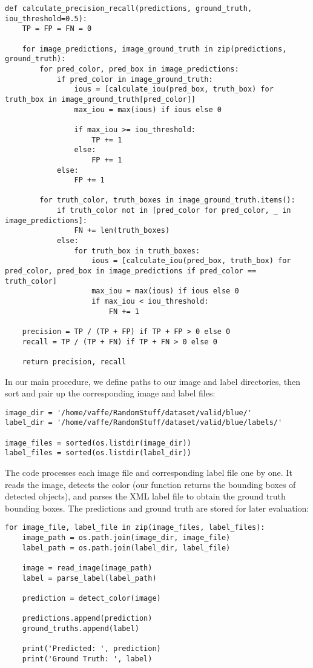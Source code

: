 \begin{lstlisting}[language=PythonPlus]
def calculate_precision_recall(predictions, ground_truth, iou_threshold=0.5):
    TP = FP = FN = 0

    for image_predictions, image_ground_truth in zip(predictions, ground_truth):
        for pred_color, pred_box in image_predictions:
            if pred_color in image_ground_truth:
                ious = [calculate_iou(pred_box, truth_box) for truth_box in image_ground_truth[pred_color]]
                max_iou = max(ious) if ious else 0

                if max_iou >= iou_threshold:
                    TP += 1
                else:
                    FP += 1
            else:
                FP += 1

        for truth_color, truth_boxes in image_ground_truth.items():
            if truth_color not in [pred_color for pred_color, _ in image_predictions]:
                FN += len(truth_boxes)
            else:
                for truth_box in truth_boxes:
                    ious = [calculate_iou(pred_box, truth_box) for pred_color, pred_box in image_predictions if pred_color == truth_color]
                    max_iou = max(ious) if ious else 0
                    if max_iou < iou_threshold:
                        FN += 1

    precision = TP / (TP + FP) if TP + FP > 0 else 0
    recall = TP / (TP + FN) if TP + FN > 0 else 0

    return precision, recall
\end{lstlisting}
\newpage
In our main procedure, we define paths to our image and label directories, then sort and pair up the corresponding image and label files:

\begin{lstlisting}[language=PythonPlus]
image_dir = '/home/vaffe/RandomStuff/dataset/valid/blue/'
label_dir = '/home/vaffe/RandomStuff/dataset/valid/blue/labels/'

image_files = sorted(os.listdir(image_dir))
label_files = sorted(os.listdir(label_dir))
\end{lstlisting}

The code processes each image file and corresponding label file one by one. It reads the image, detects the color (our function returns the bounding boxes of detected objects), and parses the XML label file to obtain the ground truth bounding boxes. The predictions and ground truth are stored for later evaluation:

\begin{lstlisting}[language=PythonPlus]
for image_file, label_file in zip(image_files, label_files):
    image_path = os.path.join(image_dir, image_file)
    label_path = os.path.join(label_dir, label_file)

    image = read_image(image_path)
    label = parse_label(label_path)

    prediction = detect_color(image)

    predictions.append(prediction)
    ground_truths.append(label)

    print('Predicted: ', prediction)
    print('Ground Truth: ', label)

\end{lstlisting}

